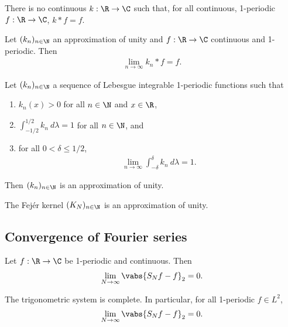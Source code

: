 \documentclass{article}
\begin{document}
\begin{lemma}
	There is no continuous $k:\R\to\C$ such that, for all continuous, 1-periodic $f:\R\to\C$,
	$k*f=f$.
\end{lemma}

\begin{lemma}
	Let $(k_n)_{n\in\N}$ an approximation of unity and $f:\R\to\C$ continuous and 1-periodic. Then
	\begin{align*}
		\lim_{n\to\infty} k_n * f = f.
	\end{align*}
\end{lemma}

\begin{theorem}[Notes 5.6]
	Let $(k_n)_{n\in\N}$ a sequence of Lebesgue integrable 1-periodic functions such that
	\begin{enumerate}
		\item $k_n(x)>0$ for all $n\in\N$ and $x\in\R$,
		\item $\int_{-1/2}^{1/2} k_n\:d\lambda = 1$ for all $n\in\N$, and
		\item for all $0<\delta\leq 1/2$, \begin{align*}
			      \lim_{n\to\infty}\int_{-\delta}^\delta k_n\:d\lambda = 1.
		      \end{align*}
	\end{enumerate}
	Then $(k_n)_{n\in\N}$ is an approximation of unity.
\end{theorem}

\begin{corollary}
	The Fej\'er kernel $(K_N)_{n\in\N}$ is an approximation of unity.
\end{corollary}

\subsection{Convergence of Fourier series}

\begin{lemma}[Notes 5.5]
	Let $f:\R\to\C$ be 1-periodic and continuous. Then
	\begin{align*}
		\lim_{N\to\infty} \vabs{S_Nf-f}_2 = 0.
	\end{align*}
\end{lemma}

\begin{theorem}[Notes 5.7]
	The trigonometric system is complete. In particular, for all 1-periodic $f\in L^2$,
	\begin{align*}
		\lim_{N\to\infty}\vabs{S_Nf-f}_2=0.
	\end{align*}
\end{theorem}
\end{document}

